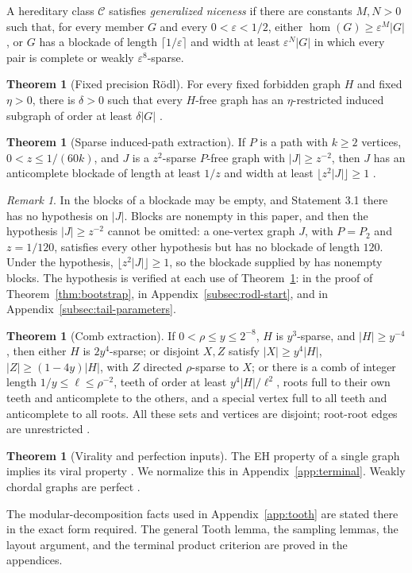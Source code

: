 \documentclass[11pt,a4paper]{article}
\theoremstyle{definition}
\newtheorem{contract}[theorem]{Theorem}
\theoremstyle{remark}
\newtheorem*{remark*}{Remark}
\numberwithin{equation}{section}
\begin{document}
A hereditary class \(\mathcal C\) satisfies \emph{generalized niceness} if there are constants \(M,N>0\) such that, for every member \(G\) and every \(0<\varepsilon<1/2\), either \(\hom(G)\ge\varepsilon^{M}|G|\), or \(G\) has a blockade of length \(\lceil1/\varepsilon\rceil\) and width at least \(\varepsilon^{N}|G|\) in which every pair is complete or weakly \(\varepsilon^{8}\)-sparse.

\begin{contract}[Fixed precision R\"odl]\label{con:rodl}
For every fixed forbidden graph \(H\) and fixed \(\eta>0\), there is \(\delta>0\) such that every \(H\)-free graph has an \(\eta\)-restricted induced subgraph of order at least \(\delta|G|\) \cite{rodl,nss7}.
\end{contract}
\begin{contract}[Sparse induced-path extraction]\label{con:path}
If \(P\) is a path with \(k\ge2\) vertices, \(0<z\le1/(60k)\), and \(J\) is a \(z^2\)-sparse \(P\)-free graph with \(|J|\ge z^{-2}\), then \(J\) has an anticomplete blockade of length at least \(1/z\) and width at least \(\lfloor z^2|J|\rfloor\ge1\) \cite[Statement 3.1]{nss}.
\end{contract}
\begin{remark*}
In \cite{nss} the blocks of a blockade may be empty, and Statement 3.1 there has no hypothesis on \(|J|\). Blocks are nonempty in this paper, and then the hypothesis \(|J|\ge z^{-2}\) cannot be omitted: a one-vertex graph \(J\), with \(P=P_2\) and \(z=1/120\), satisfies every other hypothesis but has no blockade of length \(120\). Under the hypothesis, \(\lfloor z^2|J|\rfloor\ge1\), so the blockade supplied by \cite{nss} has nonempty blocks. The hypothesis is verified at each use of Theorem~\ref{con:path}: in the proof of Theorem~\ref{thm:bootstrap}, in Appendix~\ref{subsec:rodl-start}, and in Appendix~\ref{subsec:tail-parameters}.
\end{remark*}
\begin{contract}[Comb extraction]\label{con:comb}
If \(0<\rho\le y\le2^{-8}\), \(H\) is \(y^3\)-sparse, and \(|H|\ge y^{-4}\), then either \(H\) is \(2y^4\)-sparse; or disjoint \(X,Z\) satisfy \(|X|\ge y^4|H|\), \(|Z|\ge(1-4y)|H|\), with \(Z\) directed \(\rho\)-sparse to \(X\); or there is a comb of integer length \(1/y\le\ell\le\rho^{-2}\), teeth of order at least \(y^4|H|/\ell^2\), roots full to their own teeth and anticomplete to the others, and a special vertex full to all teeth and anticomplete to all roots. All these sets and vertices are disjoint; root-root edges are unrestricted \cite[Lemma 2.10]{hjz}.
\end{contract}
\begin{contract}[Virality and perfection inputs]\label{con:viral}
The EH property of a single graph implies its viral property \cite[Theorem 4]{bfp}. We normalize this in Appendix~\ref{app:terminal}. Weakly chordal graphs are perfect \cite{hayward}.
\end{contract}
The modular-decomposition facts used in Appendix~\ref{app:tooth} are stated there in the exact form required. The general Tooth lemma, the sampling lemmas, the layout argument, and the terminal product criterion are proved in the appendices.
\end{document}
